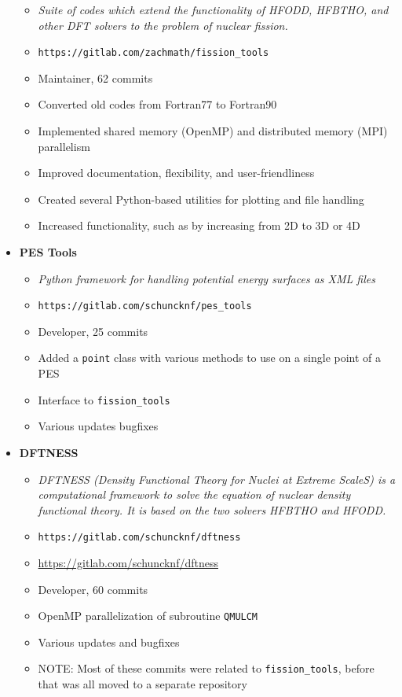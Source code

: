 \begin{itemize}
	\begin{itemize}
		\item \textit{Suite of codes which extend the functionality of HFODD, HFBTHO, and other DFT solvers to the problem of nuclear fission.}
		\item \verb|https://gitlab.com/zachmath/fission_tools|
		\item Maintainer, 62 commits
		\item Converted old codes from Fortran77 to Fortran90
		\item Implemented shared memory (OpenMP) and distributed memory (MPI) parallelism
		\item Improved documentation, flexibility, and user-friendliness
		\item Created several Python-based utilities for plotting and file handling
		\item Increased functionality, such as by increasing from 2D to 3D or 4D
	\end{itemize}
	\item \textbf{PES Tools}
	\begin{itemize}
		\item \textit{Python framework for handling potential energy surfaces as XML files}
		\item \verb|https://gitlab.com/schuncknf/pes_tools|
		\item Developer, 25 commits
		\item Added a \verb|point| class with various methods to use on a single point of a PES
		\item Interface to \verb|fission_tools|
		\item Various updates bugfixes
	\end{itemize}
	\item \textbf{DFTNESS}
	\begin{itemize}
		\item \textit{DFTNESS (Density Functional Theory for Nuclei at Extreme ScaleS) is a computational framework to solve the equation of nuclear density functional theory. It is based on the two solvers HFBTHO and HFODD.}
		\item \verb|https://gitlab.com/schuncknf/dftness|
		\item \href{https://gitlab.com/schuncknf/dftness}{https://gitlab.com/schuncknf/dftness}
		\item Developer, 60 commits
		\item OpenMP parallelization of subroutine \verb|QMULCM|
		\item Various updates and bugfixes
		\item NOTE: Most of these commits were related to \verb|fission_tools|, before that was all moved to a separate repository
	\end{itemize}
\end{itemize}
